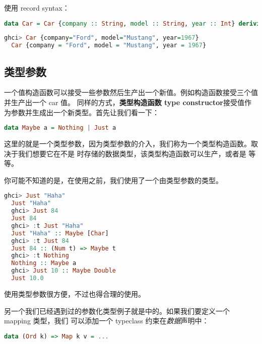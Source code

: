 \documentclass[./main.tex]{subfiles}
\begin{document}
使用 record syntax：

\begin{lstlisting}[language=Haskell]
  data Car = Car {company :: String, model :: String, year :: Int} deriving (Show)
\end{lstlisting}

\begin{lstlisting}[language=Haskell]
  ghci> Car {company="Ford", model="Mustang", year=1967}
  Car {company = "Ford", model = "Mustang", year = 1967}
\end{lstlisting}

\subsection*{类型参数}

一个值构造函数可以接受一些参数然后生产出一个新值。例如构造函数接受三个值并生产出一个 car 值。
同样的方式，\textbf{类型构造函数 type constructor}接受值作为参数并生成出一个新类型。首先让我们看一下：

\begin{lstlisting}[language=Haskell]
  data Maybe a = Nothing | Just a
\end{lstlisting}

这里的就是一个类型参数，因为类型参数的介入，我们称为一个类型构造函数。取决于我们想要它在不是
时存储的数据类型，该类型构造函数可以生产，或者是
等等。

你可能不知道的是，在使用之前，我们使用了一个由类型参数的类型。

\begin{lstlisting}[language=Haskell]
  ghci> Just "Haha"
  Just "Haha"
  ghci> Just 84
  Just 84
  ghci> :t Just "Haha"
  Just "Haha" :: Maybe [Char]
  ghci> :t Just 84
  Just 84 :: (Num t) => Maybe t
  ghci> :t Nothing
  Nothing :: Maybe a
  ghci> Just 10 :: Maybe Double
  Just 10.0
\end{lstlisting}

使用类型参数很方便，不过也得合理的使用。

另一个我们已经遇到过的参数化类型例子就是中的。如果我们要定义一个 mapping 类型，我们
可以添加一个 typeclass 约束在\textit{数据}声明中：

\begin{lstlisting}[language=Haskell]
data (Ord k) => Map k v = ...
\end{lstlisting}
\end{document}
